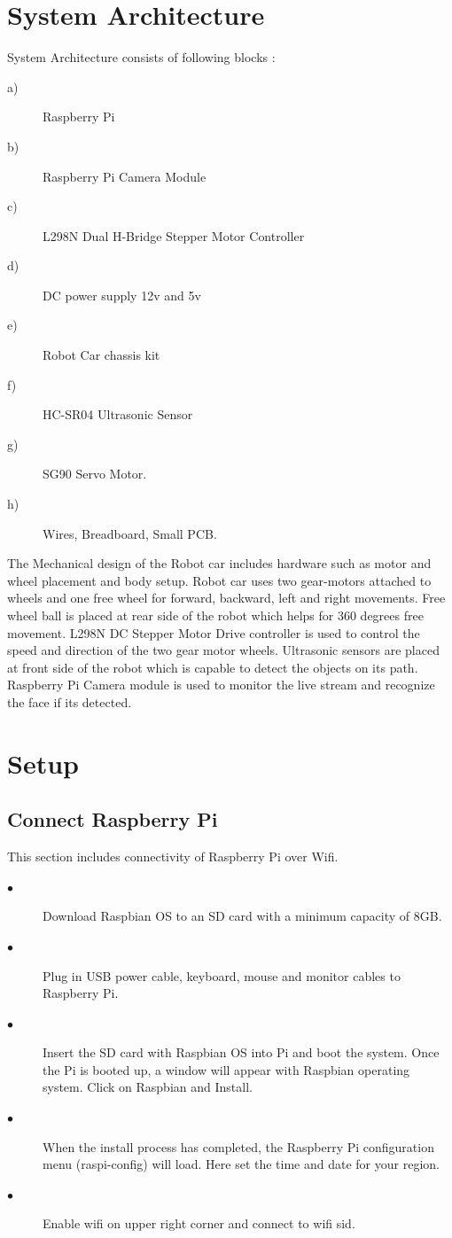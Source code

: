 \documentclass[sigconf]{acmart}
\begin{document}
\section{System Architecture}
System Architecture consists of following blocks :
\begin{description}
\item[a)] Raspberry Pi
\item[b)] Raspberry Pi Camera Module
\item[c)] L298N Dual H-Bridge Stepper Motor Controller
\item[d)] DC power supply 12v and 5v
\item[e)] Robot Car chassis kit
\item[f)] HC-SR04 Ultrasonic Sensor
\item[g)] SG90 Servo Motor.
\item[h)] Wires, Breadboard, Small PCB.
\end{description}

The Mechanical design of the Robot car includes hardware such as motor and wheel placement and body setup. Robot car uses two gear-motors attached to wheels and one free wheel for forward, backward, left and right movements. Free wheel ball is placed at rear side of the robot which helps for 360 degrees free movement. L298N DC Stepper Motor Drive controller is used to control the speed and direction of the two gear motor wheels. Ultrasonic sensors are placed at front side of the robot which is capable to detect the objects on its path. Raspberry Pi Camera module is used to monitor the live stream and recognize the face if its detected.

\section{Setup}
\subsection{Connect Raspberry Pi}
This section includes connectivity of Raspberry Pi over Wifi. 
\begin{description}

    \item[$\bullet$] Download Raspbian OS to an SD card with a minimum capacity of 8GB.
    
    \item[$\bullet$] Plug in USB power cable, keyboard, mouse and monitor cables to Raspberry Pi.
    
    \item[$\bullet$] Insert the SD card with Raspbian OS into Pi and boot the system. Once the Pi is booted up, a window will appear with Raspbian operating system. Click on Raspbian and Install.
    
    \item[$\bullet$] When the install process has completed, the Raspberry Pi configuration menu (raspi-config) will load. Here  set the time and date for your region.
    
    \item[$\bullet$] Enable wifi on upper right corner and connect to wifi sid.
\end{description}
\end{document}
